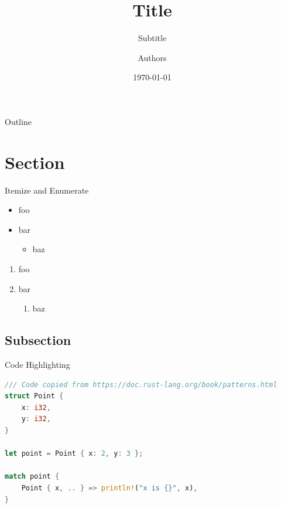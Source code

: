 \documentclass[11pt,aspectratio=169]{beamer}
\title[Title at bottom]{Title}
\subtitle{Subtitle}
\author[Authors at bottom]{Authors}
\institute[Bauhaus-Universität Weimar]{}
\date[\today]{\today}
\begin{document}

\begin{frame}[plain]
  \titlepage
\end{frame}

\begin{frame}{Outline}
\tableofcontents
\end{frame}

\section{Section}


\begin{frame}{Itemize and Enumerate}
    \begin{itemize}
      \item foo
      \item bar
        \begin{itemize}
          \item baz
        \end{itemize}
    \end{itemize}
    \begin{enumerate}
      \item foo
      \item bar
        \begin{enumerate}
          \item baz
        \end{enumerate}
    \end{enumerate}
\end{frame}

\subsection{Subsection}
\begin{frame}[fragile]{Code Highlighting}
  \begin{lstlisting}[language=Rust]
/// Code copied from https://doc.rust-lang.org/book/patterns.html
struct Point {
    x: i32,
    y: i32,
}

let point = Point { x: 2, y: 3 };

match point {
    Point { x, .. } => println!("x is {}", x),
}
  \end{lstlisting}
\end{frame}
\end{document}
